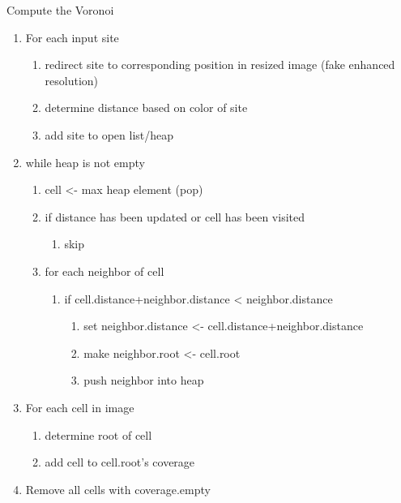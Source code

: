 \documentclass[11pt]{article}
\begin{document}
Compute the Voronoi
\begin{enumerate}
\item For each input site
	\begin{enumerate}
	\item redirect site to corresponding position in resized image (fake enhanced resolution)
	\item determine distance based on color of site
	\item add site to open list/heap
	\end{enumerate}
	
\item while heap is not empty
\begin{enumerate}
	\item cell <- max heap element (pop)
	\item if distance has been updated or cell has been visited
		\begin{enumerate}
		\item skip
		\end{enumerate}
		
	\item for each neighbor of cell
	\begin{enumerate}
	\item if cell.distance+neighbor.distance < neighbor.distance
	\begin{enumerate}
	\item set neighbor.distance <- cell.distance+neighbor.distance
			\item make neighbor.root <- cell.root
			\item push neighbor into heap
	\end{enumerate}
			
	\end{enumerate}
		
\end{enumerate}
	
\item For each cell in image
	\begin{enumerate}
	\item determine root of cell
	\item add cell to cell.root's coverage
	\end{enumerate}
	
\item Remove all cells with coverage.empty
\end{enumerate}
\end{document}
